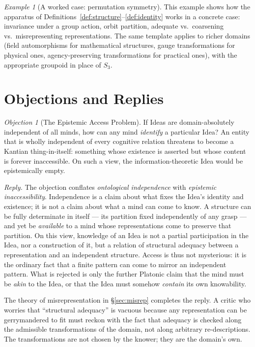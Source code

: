 \documentclass[11pt,a4paper]{article}
\theoremstyle{definition}
\theoremstyle{remark}
\newtheorem{objection}{Objection}[section]
\newtheorem{example}{Example}[section]
\begin{document}
\begin{example}[A worked case: permutation symmetry]
This example shows how the apparatus of
Definitions~\ref{def:structure}--\ref{def:identity} works in a
concrete case: invariance under a group action, orbit partition,
adequate vs.\ coarsening vs.\ misrepresenting representations. The
same template applies to richer domains (field automorphisms for
mathematical structures, gauge transformations for physical ones,
agency-preserving transformations for practical ones), with the
appropriate groupoid in place of $S_3$.
\end{example}

\section{Objections and Replies}

\begin{objection}[The Epistemic Access Problem]
If Ideas are domain-absolutely independent of all minds, how can any
mind \emph{identify} a particular Idea? An entity that is wholly
independent of every cognitive relation threatens to become a Kantian
thing-in-itself: something whose existence is asserted but whose
content is forever inaccessible. On such a view, the
information-theoretic Idea would be epistemically empty.
\end{objection}

\noindent
\emph{Reply.} The objection conflates \emph{ontological independence}
with \emph{epistemic inaccessibility}. Independence is a claim about
what fixes the Idea's identity and existence; it is not a claim about
what a mind can come to know. A structure can be fully determinate in
itself --- its partition fixed independently of any grasp --- and yet
be \emph{available} to a mind whose representations come to preserve
that partition. On this view, knowledge of an Idea is not a partial
participation in the Idea, nor a construction of it, but a relation of
structural adequacy between a representation and an independent
structure. Access is thus not mysterious: it is the ordinary fact that
a finite pattern can come to mirror an independent pattern. What is
rejected is only the further Platonic claim that the mind must be
\emph{akin} to the Idea, or that the Idea must somehow \emph{contain}
its own knowability.

The theory of misrepresentation in \S\ref{sec:misrep} completes the
reply. A critic who worries that ``structural adequacy'' is vacuous
because any representation can be gerrymandered to fit must reckon
with the fact that adequacy is checked along the admissible
transformations of the domain, not along arbitrary re-descriptions.
The transformations are not chosen by the knower; they are the
domain's own.
\end{document}
